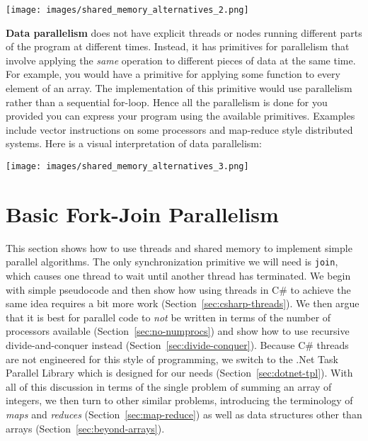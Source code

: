 \documentclass[10pt]{article}
\begin{document}
\begin{center}
\medskip
\texttt{[image: images/shared\_memory\_alternatives\_2.png]}
\end{center}


\medskip
\noindent\textbf{Data parallelism} does not have explicit threads or nodes
running different parts of the program at different times.  Instead,
it has primitives for parallelism that involve applying the
\emph{same} operation to different pieces of data at the same time.
For example, you would have a primitive for applying some function to
every element of an array.  The implementation of this primitive would
use parallelism rather than a sequential for-loop.  Hence all the
parallelism is done for you provided you can express your program
using the available primitives.  Examples include vector instructions
on some processors and map-reduce style distributed systems.  Here is
a visual interpretation of data parallelism:

\begin{center}
\medskip
\texttt{[image: images/shared\_memory\_alternatives\_3.png]}
\end{center}

\section{Basic Fork-Join Parallelism}
\label{sec:fork-join}

This section shows how to use threads and shared memory to implement
simple parallel algorithms.  The only synchronization primitive we
will need is {\tt join}, which causes one thread to wait until another
thread has terminated.  We begin with simple pseudocode and then show
how using threads in C\# to achieve the same idea requires a bit more
work (Section~\ref{sec:csharp-threads}).  We then argue that it is best
for parallel code to \emph{not} be written in terms of the number of
processors available (Section~\ref{sec:no-numprocs}) and show how to
use recursive divide-and-conquer instead
(Section~\ref{sec:divide-conquer}).  Because C\# threads are not
engineered for this style of programming, we switch to the .Net Task
Parallel Library which is designed for our needs
(Section~\ref{sec:dotnet-tpl}).  With all of this discussion in terms of
the single problem of summing an array of integers, we then turn to
other similar problems, introducing the terminology of \emph{maps} and
\emph{reduces} (Section~\ref{sec:map-reduce}) as well as data
structures other than arrays (Section~\ref{sec:beyond-arrays}).
\end{document}

